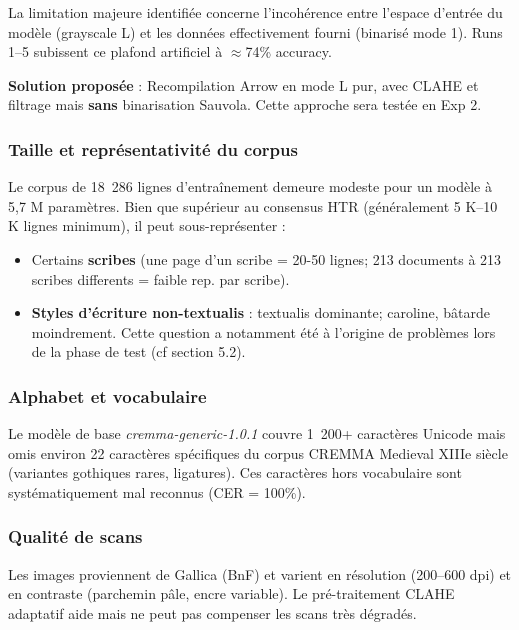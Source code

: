 ﻿\documentclass[twoside,twocolumn,10pt]{article}
\begin{document}
La limitation majeure identifiée concerne l'incohérence entre l'espace d'entrée du modèle (grayscale L) et les données effectivement fourni (binarisé mode 1). Runs 1--5 subissent ce plafond artificiel à $\approx$74\% accuracy.

\textbf{Solution proposée} : Recompilation Arrow en mode L pur, avec CLAHE et filtrage mais \textbf{sans} binarisation Sauvola. Cette approche sera testée en Exp 2.

\subsubsection{Taille et représentativité du corpus}

Le corpus de 18~286 lignes d'entraînement demeure modeste pour un modèle à 5,7 M paramètres. Bien que supérieur au consensus HTR (généralement 5 K--10 K lignes minimum), il peut sous-représenter :

\begin{itemize}
  \item Certains \textbf{scribes} (une page d'un scribe = 20-50 lignes; 213 documents à 213 scribes differents = faible rep. par scribe).
  \item \textbf{Styles d'écriture non-textualis} : textualis dominante; caroline, bâtarde moindrement. Cette question a notamment été à l'origine de problèmes lors de la phase de test (cf section 5.2).
\end{itemize}

\subsubsection{Alphabet et vocabulaire}

Le modèle de base \textit{cremma-generic-1.0.1} couvre 1~200+ caractères Unicode mais omis environ 22 caractères spécifiques du corpus CREMMA Medieval XIIIe siècle (variantes gothiques rares, ligatures). Ces caractères hors vocabulaire sont systématiquement mal reconnus (CER = 100\%).

\subsubsection{Qualité de scans}

Les images proviennent de Gallica (BnF) et varient en résolution (200--600 dpi) et en contraste (parchemin pâle, encre variable). Le pré-traitement CLAHE adaptatif aide mais ne peut pas compenser les scans très dégradés.
\end{document}
